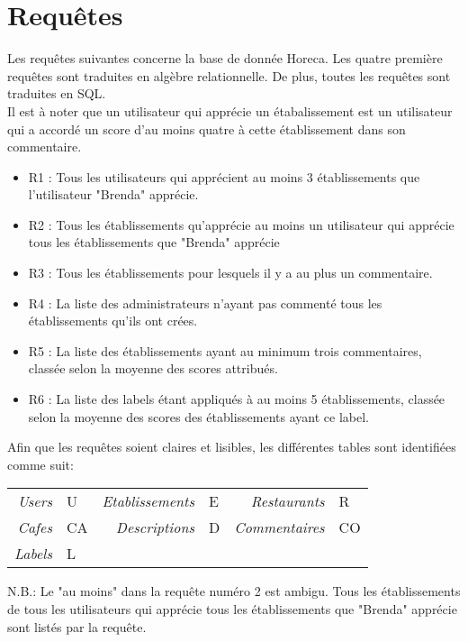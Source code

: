 \section{Requêtes}
\noindent Les requêtes suivantes concerne la base de donnée Horeca. Les quatre première requêtes sont traduites en algèbre relationnelle. De plus, toutes les requêtes sont traduites en SQL.\\
Il est à noter que un utilisateur qui apprécie un étabalissement est un utilisateur qui a accordé un score d'au moins quatre à cette établissement dans son commentaire.
\begin{itemize}
    \item R1 : Tous les utilisateurs qui apprécient au moins 3 établissements que l’utilisateur "Brenda" apprécie.
    \item R2 : Tous les établissements qu’apprécie au moins un utilisateur qui apprécie tous les établissements que
"Brenda" apprécie
    \item R3 : Tous les établissements pour lesquels il y a au plus un commentaire.
    \item R4 : La liste des administrateurs n’ayant pas commenté tous les établissements qu’ils ont crées.
    \item R5 : La liste des établissements ayant au minimum trois commentaires, classée selon la moyenne des scores
attribués.
    \item R6 : La liste des labels étant appliqués à au moins 5 établissements, classée selon la moyenne des scores des
établissements ayant ce label.
\end{itemize}

\noindent Afin que les requêtes soient claires et lisibles, les différentes tables sont identifiées comme suit:
\begin{center}
\begin{tabular}{r l r l r l}
    \textit{Users} & U & \textit{Etablissements} & E & \textit{Restaurants} & R \\
    \textit{Cafes} & CA & \textit{Descriptions} & D & \textit{Commentaires} & CO\\
    \textit{Labels} & L & & & &\\
\end{tabular}
\end{center}
N.B.: Le "au moins" dans la requête numéro 2 est ambigu. Tous les établissements de tous les utilisateurs qui apprécie tous les établissements que "Brenda" apprécie sont listés par la requête.
